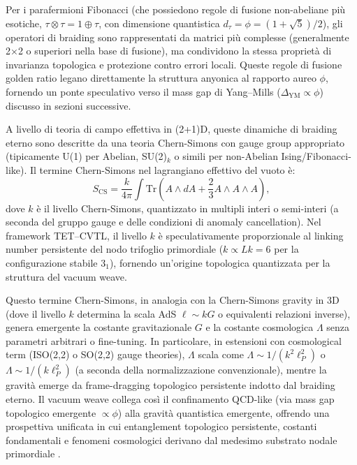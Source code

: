 \documentclass[11pt,a4paper]{article}
\let\oldcite\cite
\renewcommand{\cite}{\protect\oldcite}
\theoremstyle{plain}
\theoremstyle{definition}
\begin{document}
Per i parafermioni Fibonacci (che possiedono regole di fusione non-abeliane più esotiche, $\tau \otimes \tau = 1 \oplus \tau$, con dimensione quantistica $d_\tau = \phi = (1 + \sqrt{5})/2$), gli operatori di braiding sono rappresentati da matrici più complesse (generalmente 2×2 o superiori nella base di fusione), ma condividono la stessa proprietà di invarianza topologica e protezione contro errori locali. Queste regole di fusione golden ratio legano direttamente la struttura anyonica al rapporto aureo $\phi$, fornendo un ponte speculativo verso il mass gap di Yang–Mills ($\Delta_{\text{YM}} \propto \phi$) discusso in sezioni successive.

A livello di teoria di campo effettiva in (2+1)D, queste dinamiche di braiding eterno sono descritte da una teoria Chern-Simons con gauge group appropriato (tipicamente U(1) per Abelian, SU(2)$_k$ o simili per non-Abelian Ising/Fibonacci-like). Il termine Chern-Simons nel lagrangiano effettivo del vuoto è:
\begin{equation}
S_{\mathrm{CS}} = \frac{k}{4\pi} \int \mathrm{Tr} \left( A \wedge dA + \frac{2}{3} A \wedge A \wedge A \right),
\end{equation}
dove $k$ è il livello Chern-Simons, quantizzato in multipli interi o semi-interi (a seconda del gruppo gauge e delle condizioni di anomaly cancellation). Nel framework TET--CVTL, il livello $k$ è speculativamente proporzionale al linking number persistente del nodo trifoglio primordiale ($k \propto Lk = 6$ per la configurazione stabile 3$_1$), fornendo un'origine topologica quantizzata per la struttura del vacuum weave.

Questo termine Chern-Simons, in analogia con la Chern-Simons gravity in 3D (dove il livello $k$ determina la scala AdS $\ell \sim k G$ o equivalenti relazioni inverse), genera emergente la costante gravitazionale $G$ e la costante cosmologica $\Lambda$ senza parametri arbitrari o fine-tuning. In particolare, in estensioni con cosmological term (ISO(2,2) o SO(2,2) gauge theories), $\Lambda$ scala come $\Lambda \sim 1/(k^2 \ell_P^2)$ o $\Lambda \sim 1/(k \ell_P^2)$ (a seconda della normalizzazione convenzionale), mentre la gravità emerge da frame-dragging topologico persistente indotto dal braiding eterno. Il vacuum weave collega così il confinamento QCD-like (via mass gap topologico emergente $\propto \phi$) alla gravità quantistica emergente, offrendo una prospettiva unificata in cui entanglement topologico persistente, costanti fondamentali e fenomeni cosmologici derivano dal medesimo substrato nodale primordiale \cite{PhysSoliman2026DeSitter, PhysSoliman2026TUGUTSYSY}.
\end{document}
